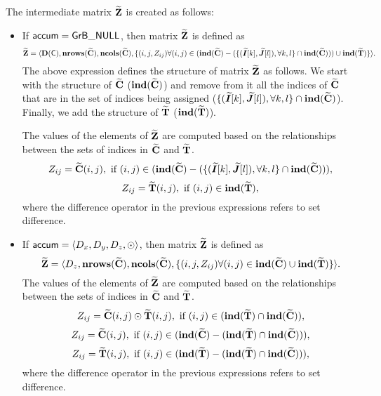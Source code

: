 The intermediate matrix ${\bf \widetilde{Z}}$ is created as follows:
\begin{itemize}
    \item If ${\sf accum} = {\sf GrB\_NULL}$, then matrix
    ${\bf \widetilde{Z}}$ is defined as 
        \[ 
        {\bf \widetilde{Z}} =
		\langle \bold{D}({\sf C}), \bold{nrows}({\bf \widetilde{C}}),
        \bold{ncols}({\bf \widetilde{C}}), 
		\{(i,j,Z_{ij})  \forall (i,j) \in (\bold{ind}({\bf \widetilde{C}}) - (\{ (\bm{\widetilde{I}}[k],\bm{\widetilde{J}}[l]), \forall k,l\} \cap \bold{ind}({\bf \widetilde{C}}))) \cup 
        \bold{ind}({\bf \widetilde{T}}) \} \rangle.\]
    The above expression defines the structure of matrix ${\bf \widetilde{Z}}$ as follows.
		We start with the structure of ${\bf \widetilde{C}}$ ($\bold{ind}({\bf \widetilde{C}})$) and remove from 
		it all the indices of ${\bf \widetilde{C}}$ that are
		in the set of indices being assigned ($\{(\bm{\widetilde{I}}[k],\bm{\widetilde{J}}[l]),\forall k,l\} \cap \bold{ind}({\bf \widetilde{C}})$). Finally, we
		add the structure of ${\bf \widetilde{T}}$ ($\bold{ind}({\bf \widetilde{T}})$).

    The values of the elements of ${\bf \widetilde{Z}}$ are computed based on 
    the relationships between the sets of indices in ${\bf \widetilde{C}}$ and 
    ${\bf \widetilde{T}}$.
\[
	Z_{ij} = {\bf \widetilde{C}}(i,j), \mbox{~if~}  (i,j) \in  
		(\bold{ind}({\bf \widetilde{C}}) - (\{ (\bm{\widetilde{I}}[k],\bm{\widetilde{J}}[l]), \forall k,     l\} \cap \bold{ind}({\bf \widetilde{C}}))),
\]
\[
	Z_{ij} = {\bf \widetilde{T}}(i,j), \mbox{~if~}  (i,j) \in  
		\bold{ind}({\bf \widetilde{T}}),
\]
where the difference operator in the previous expressions refers to set difference.

    \item If ${\sf accum} = \langle D_x, D_y, D_z, \odot \rangle$, then matrix 
    ${\bf \widetilde{Z}}$ is defined as 
        \[ 
        {\bf \widetilde{Z}} =
        \langle D_z, \bold{nrows}({\bf \widetilde{C}}),
        \bold{ncols}({\bf \widetilde{C}}), 
		\{(i,j,Z_{ij})  \forall (i,j) \in \bold{ind}({\bf \widetilde{C}}) \cup 
        \bold{ind}({\bf \widetilde{T}}) \} \rangle.\]
    The values of the elements of ${\bf \widetilde{Z}}$ are computed based on 
    the relationships between the sets of indices in ${\bf \widetilde{C}}$ and 
    ${\bf \widetilde{T}}$.
\[
	Z_{ij} = {\bf \widetilde{C}}(i,j) \odot {\bf \widetilde{T}}(i,j), 
    \mbox{~if~} (i,j) \in  (\bold{ind}({\bf \widetilde{T}}) \cap 
    \bold{ind}({\bf \widetilde{C}})),
\]
\[
	Z_{ij} = {\bf \widetilde{C}}(i,j), \mbox{~if~}  (i,j) \in  
    (\bold{ind}({\bf \widetilde{C}}) - (\bold{ind}({\bf \widetilde{T}}) \cap 
    \bold{ind}({\bf \widetilde{C}}))),
\]
\[
	Z_{ij} = {\bf \widetilde{T}}(i,j), \mbox{~if~}  (i,j) \in  
    (\bold{ind}({\bf \widetilde{T}}) - (\bold{ind}({\bf \widetilde{T}}) \cap 
    \bold{ind}({\bf \widetilde{C}}))),
\]
where the difference operator in the previous expressions refers to set difference.
\end{itemize}

